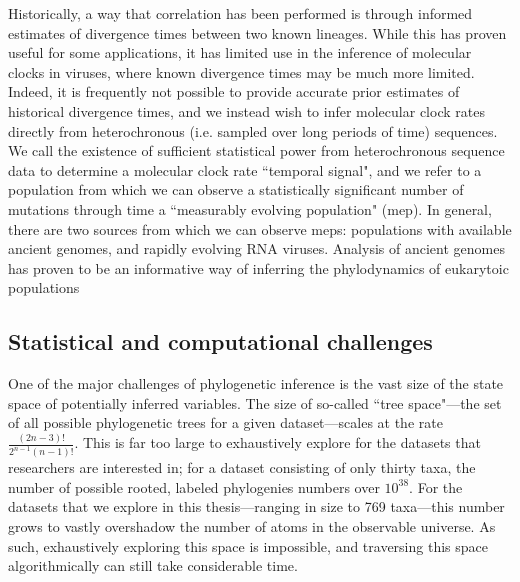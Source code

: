 Historically, a way that correlation has been performed is through informed estimates of divergence times between two known lineages\cite{humanApeDivergence}.
While this has proven useful for some applications, it has limited use in the inference of molecular clocks in viruses, where known divergence times may be much more limited.
Indeed, it is frequently not possible to provide accurate prior estimates of historical divergence times, and we instead wish to infer molecular clock rates directly from heterochronous (i.e. sampled over long periods of time) sequences.
We call the existence of sufficient statistical power from heterochronous sequence data to determine a molecular clock rate ``temporal signal", and we refer to a population from which we can observe a statistically significant number of mutations through time a ``measurably evolving population" (\gls{mep})\cite{drummond2003MEP}.
In general, there are two sources from which we can observe \gls{mep}s: populations with available ancient genomes, and rapidly evolving RNA viruses.
Analysis of ancient genomes has proven to be an informative way of inferring the phylodynamics of eukarytoic populations\cite{shapiro2004bison}


\subsection{Statistical and computational challenges} %

One of the major challenges of phylogenetic inference is the vast size of the state space of potentially inferred variables.
The size of so-called ``tree space"---the set of all possible phylogenetic trees for a given dataset---scales at the rate $\frac{(2n-3)!}{2^{n-1}(n-1)!}$.
This is far too large to exhaustively explore for the datasets that researchers are interested in; for a dataset consisting of only thirty taxa, the number of possible rooted, labeled phylogenies numbers over $10^{38}$\cite{felsenstein2003inferring}.
For the datasets that we explore in this thesis---ranging in size to 769 taxa---this number grows to vastly overshadow the number of atoms in the observable universe.
As such, exhaustively exploring this space is impossible, and traversing this space algorithmically can still take considerable time.

